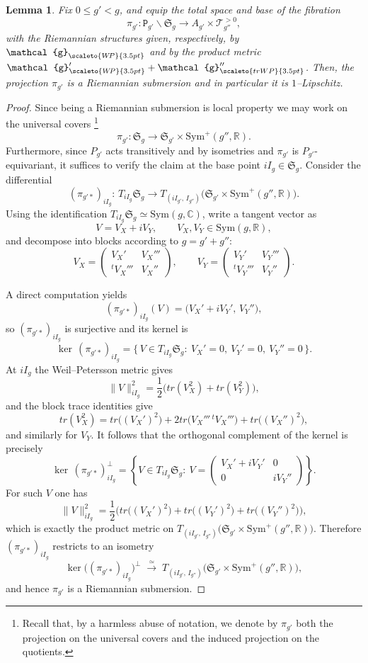 \documentclass[11pt]{amsart}
\theoremstyle{plain}
\newtheorem{lemma}[theorem]{Lemma}
\theoremstyle{definition}
\theoremstyle{remark}
\newcommand{\C}{{\mathbb C}}
\newcommand{\R}{\mathbb R}
\newcommand{\fS}{\mathfrak{S}}
\newcommand{\g}{\mathcal{g}}
\newcommand{\sym}{\mathrm{Sym}^{\!+}}
\newcommand{\tP}{\mathtt{P}}
\newcommand{\WP}{\scaleto{W\!P}{3.5pt}}
\newcommand{\trWP}{\scaleto{trWP}{3.5pt}}
\newcommand{\cT}[1]{\mathscr{T}_{#1}^{\scriptscriptstyle{>0}}}
\begin{document}
\begin{lemma}
    \label{lem:riem.subm.gen}
    Fix $0\leq g'< g$, and equip the total space and base of the fibration 
    \[
    \pi_{g'} : \tP_{g'} \backslash \fS_g \to A_{g'} \times \cT{g''},
    \]
    with the Riemannian structures given, respectively, by $\g_{\WP}$ and by the product metric $\g'_{\WP} + \g''_{\trWP}$. Then, the projection $\pi_{g'}$ is a Riemannian submersion and in particular it is $1$--Lipschitz. 
\end{lemma}

\begin{proof}
Since being a Riemannian submersion is local property we may work on the universal covers \footnote{Recall that, by a harmless abuse of notation, we denote by $\pi_{g'}$ both the projection on the universal covers and the induced projection on the quotients.}
\[
\pi_{g'}:\fS_g\longrightarrow \fS_{g'}\times \sym(g'',\R).
\]
Furthermore, since $P_{g'}$ acts transitively and by isometries and $\pi_{g'}$ is $P_{g'}$-equivariant, it suffices to verify the claim at the base point $iI_g\in\fS_g$. Consider the differential
\[
(\pi_{g'*})_{iI_g}:\,T_{iI_g}\fS_g \longrightarrow
T_{(iI_{g'},\,I_{g''})}\bigl(\fS_{g'}\times \sym(g'',\R)\bigr).
\]
Using the identification $T_{iI_g}\fS_g\simeq \mathrm{Sym}(g,\C)$, write a tangent vector as
\[
V=V_X+iV_Y,\qquad V_X,V_Y\in\mathrm{Sym}(g,\R),
\]
and decompose into blocks according to $g=g'+g''$:
\[
V_X=
\begin{pmatrix}
V_X' & V_X'''\\
{}^tV_X''' & V_X''
\end{pmatrix},
\qquad
V_Y=
\begin{pmatrix}
V_Y' & V_Y'''\\
{}^tV_Y''' & V_Y''
\end{pmatrix}.
\]

A direct computation yields
\[
(\pi_{g'*})_{iI_g}(V)=\bigl(V_X'+iV_Y',\,V_Y''\bigr),
\]
so $(\pi_{g'*})_{iI_g}$ is surjective and its kernel is
\[
\ker\,(\pi_{g'*})_{iI_g}
=
\{\,V\in T_{iI_g}\fS_g:\ V_X'=0,\ V_Y'=0,\ V_Y''=0\,\}.
\]
At $iI_g$ the Weil--Petersson metric gives
\[
\|V\|^2_{iI_g}=\frac{1}{2}\bigl(tr(V_X^2)+tr(V_Y^2)\bigr),
\]
and the block trace identities give
\[
tr(V_X^2)=tr\big((V_X')^2\big)+2tr\big(V_X'''\,{}^tV_X'''\big)+tr\big((V_X'')^2\big),
\]
and similarly for $V_Y$. It follows that the orthogonal complement of the kernel is precisely
\[
\ker\,(\pi_{g'*})_{iI_g}^\perp
=
\left\{
V\in T_{iI_g}\fS_g:\ 
V=
\begin{pmatrix}
V_X'+iV_Y' & 0\\
0 & iV_Y''
\end{pmatrix}
\right\}.
\]
For such $V$ one has
\[
\|V\|^2_{iI_g}
=
\frac{1}{2}\bigl(tr\big((V_X')^2\big)+tr\big((V_Y')^2\big)+tr\big((V_Y'')^2\big)\bigr),
\]
which is exactly the product metric on
$T_{(iI_{g'},\,I_{g''})}\bigl(\fS_{g'}\times\sym(g'',\R)\bigr)$.
Therefore $(\pi_{g'*})_{iI_g}$ restricts to an isometry
\[
\ker\bigl((\pi_{g'*})_{iI_g}\bigr)^\perp
\;\xrightarrow{\ \simeq\ }\;
T_{(iI_{g'},\,I_{g''})}\bigl(\fS_{g'}\times\sym(g'',\R)\bigr),
\]
and hence $\pi_{g'}$ is a Riemannian submersion.
\end{proof}
\end{document}
